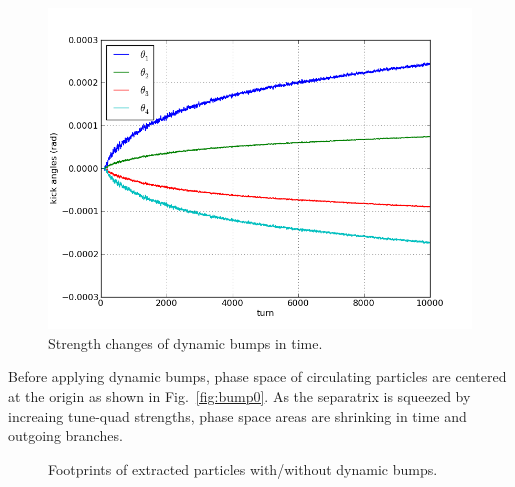 \documentclass[aps,prstab,onecolumn,preprint,nofootinbib]{revtex4-1}
\begin{document}
\begin{figure}[tbh!]
  \begin{center}
    \includegraphics[width=.45\textwidth]{img/20140123-00.png}
    \caption{\label{fig:bump2}Strength changes of dynamic bumps in time.}
  \end{center}
\end{figure}

Before applying dynamic bumps, phase space of circulating particles are centered at the origin as shown in Fig.~\ref{fig:bump0}.
As the separatrix is squeezed by increaing tune-quad strengths, phase space areas are shrinking in time and outgoing branches.


\begin{figure}[tbh!]
  \begin{center}
    \caption{\label{fig:bump4}Footprints of extracted particles with/without dynamic bumps.}
  \end{center}
\end{figure}
\end{document}
